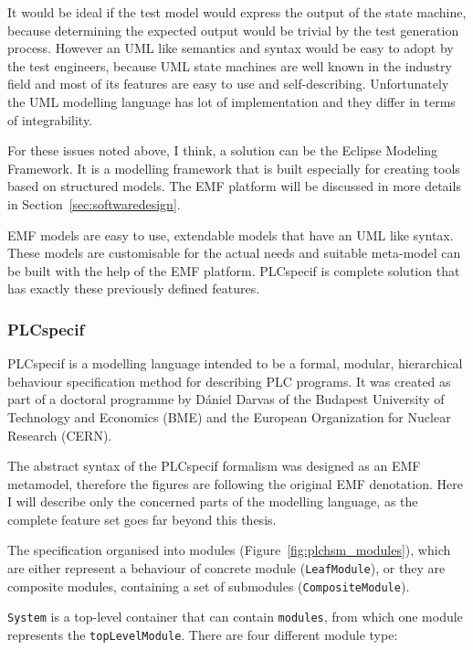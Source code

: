 It would be ideal if the test model would express the output of the state machine, because determining the expected output would be trivial by the test generation process. However an UML like semantics and syntax would be easy to adopt by the test engineers, because UML state machines are well known in the industry field and most of its features are easy to use and self-describing. Unfortunately the UML modelling language has lot of implementation and they differ in terms of integrability.

For these issues noted above, I think, a solution can be the Eclipse Modeling Framework. It is a modelling framework that is built especially for creating tools based on structured models. The EMF platform will be discussed in more details in Section~\ref{sec:softwaredesign}.

EMF models are easy to use, extendable models that have an UML like syntax.  These models are customisable for the actual needs and suitable meta-model can be built with the help of the EMF platform. PLCspecif is complete solution that has exactly these previously defined features.

\subsubsection{PLCspecif}
\label{ssub:plcspecif}

PLCspecif \cite{plcspecif} is a modelling language intended to be a formal, modular, hierarchical behaviour specification method for describing PLC programs. It was created as part of a doctoral programme by Dániel Darvas of the Budapest University of Technology and Economics (BME) and the European Organization for Nuclear Research (CERN).

The abstract syntax of the PLCspecif formalism was designed as an EMF metamodel, therefore the figures are following the original EMF denotation. Here I will describe only the concerned parts of the modelling language, as the complete feature set goes far beyond this thesis.

The specification organised into modules (Figure~\ref{fig:plchsm_modules}), which are either represent a behaviour of concrete module (\texttt{LeafModule}), or they are composite modules, containing a set of submodules (\texttt{CompositeModule}).

\texttt{System} is a top-level container that can contain \texttt{modules}, from which one module represents the \texttt{topLevelModule}. There are four different module type:

